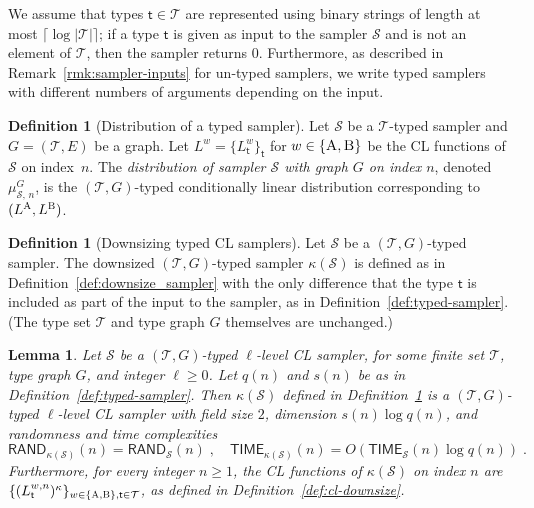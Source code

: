 \documentclass[11pt]{article}
\newtheorem{lemma}[theorem]{Lemma}
\theoremstyle{definition}
\newtheorem{definition}[theorem]{Definition}
\newcommand{\downsize}{\kappa}
\newcommand{\sampler}{\mathcal{S}}
\newcommand{\type}{\mathcal{T}}
\newcommand{\labelstyle}[1]{\ensuremath{\textsc{#1}}\xspace}
\newcommand{\tvarstyle}[1]{\mathsf{#1}}
\newcommand{\tvar}{\ensuremath{\tvarstyle{t}}}
\newcommand{\alice}{\labelstyle{A}}
\newcommand{\bob}{\labelstyle{B}}
\newcommand{\TIME}{\mathsf{TIME}}
\newcommand{\RAND}{\mathsf{RAND}}
\begin{document}
We assume that types $\tvar \in \type$ are represented using binary strings of
length at most $\lceil \log |\type| \rceil$; if a type $\tvar$ is given as input
to the sampler $\sampler$ and is not an element of $\type$, then the sampler
returns $0$. Furthermore, as described in Remark~\ref{rmk:sampler-inputs} for un-typed samplers, we write typed samplers with different numbers of arguments depending on the input. 

\begin{definition}[Distribution of a typed sampler]
  \label{def:typed-sampler-sample}
  Let $\sampler$ be a $\type$-typed sampler and $G = (\type,E)$ be a graph.
  Let $L^w = \{ L^{w}_{\tvar} \}_\tvar$ for $w\in \{\alice, \bob\}$ be the CL
  functions of $\sampler$ on index~$n$.
  The \emph{distribution of sampler $\sampler$ with graph $G$ on index $n$},
  denoted $\mu^G_{\sampler,\, n}$, is the $(\type, G)$-typed conditionally
  linear distribution corresponding to $(L^\alice, L^\bob)$.
\end{definition}


\begin{definition}[Downsizing typed CL samplers]
  \label{def:downsize-typed-sampler}
  Let $\sampler$ be a $(\type,G)$-typed sampler.
  The downsized $(\type,G)$-typed sampler $\downsize(\sampler)$ is defined as in
  Definition~\ref{def:downsize_sampler} with the only difference that the type
  $\tvar$ is included as part of the input to the sampler, as in
  Definition~\ref{def:typed-sampler}.
  (The type set $\type$ and type graph $G$ themselves are unchanged.)
\end{definition}

\begin{lemma}
  \label{lem:downsize_typed_sampler}
  Let $\sampler$ be a $(\type,G)$-typed $\ell$-level CL sampler, for some finite set
  $\type$, type graph $G$, and integer $\ell\geq 0$.
  Let $q(n)$ and $s(n)$ be as in Definition~\ref{def:typed-sampler}.
  Then $\downsize(\sampler)$ defined in
  Definition~\ref{def:downsize-typed-sampler} is a $(\type,G)$-typed $\ell$-level CL
  sampler with field size $2$, dimension $s(n) \log q(n)$, and randomness and
  time complexities
  \begin{equation*}
    \RAND_{\downsize(\sampler)}(n) = \RAND_\sampler(n)\;,\quad
    \TIME_{\downsize(\sampler)}(n) = O(\TIME_\sampler(n) \log q(n))\;.
  \end{equation*}
  Furthermore, for every integer $n \geq 1$, the CL functions of
  $\downsize(\sampler)$ on index $n$ are
  $\{(L_\tvar^{w,n})^\downsize\}_{w\in\{\alice,\bob\}, \tvar\in\type}$, as
  defined in Definition~\ref{def:cl-downsize}.
\end{lemma}
\end{document}
